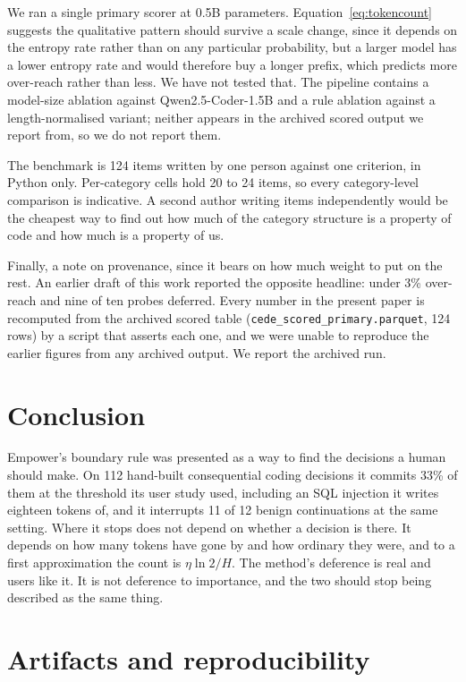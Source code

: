 \documentclass[10pt]{article}
\begin{document}
We ran a single primary scorer at 0.5B parameters. Equation~\ref{eq:tokencount} suggests the
qualitative pattern should survive a scale change, since it depends on the entropy rate rather than
on any particular probability, but a larger model has a lower entropy rate and would therefore buy a
longer prefix, which predicts more over-reach rather than less. We have not tested that. The pipeline
contains a model-size ablation against Qwen2.5-Coder-1.5B and a rule ablation against a
length-normalised variant; neither appears in the archived scored output we report from, so we do
not report them.

The benchmark is 124 items written by one person against one criterion, in Python only.
Per-category cells hold 20 to 24 items, so every category-level comparison is indicative. A second
author writing items independently would be the cheapest way to find out how much of the category
structure is a property of code and how much is a property of us.

Finally, a note on provenance, since it bears on how much weight to put on the rest. An earlier draft
of this work reported the opposite headline: under 3\% over-reach and nine of ten probes deferred.
Every number in the present paper is recomputed from the archived scored table
(\texttt{cede\_scored\_primary.parquet}, 124 rows) by a script that asserts each one, and we were
unable to reproduce the earlier figures from any archived output. We report the archived run.

\section{Conclusion}

Empower's boundary rule was presented as a way to find the decisions a human should make. On 112
hand-built consequential coding decisions it commits 33\% of them at the threshold its user study
used, including an SQL injection it writes eighteen tokens of, and it interrupts 11 of 12 benign
continuations at the same setting. Where it stops does not depend on whether a decision is there. It
depends on how many tokens have gone by and how ordinary they were, and to a first approximation the
count is $\eta \ln 2 / H$. The method's deference is real and users like it. It is not deference to
importance, and the two should stop being described as the same thing.

\section*{Artifacts and reproducibility}
\end{document}
